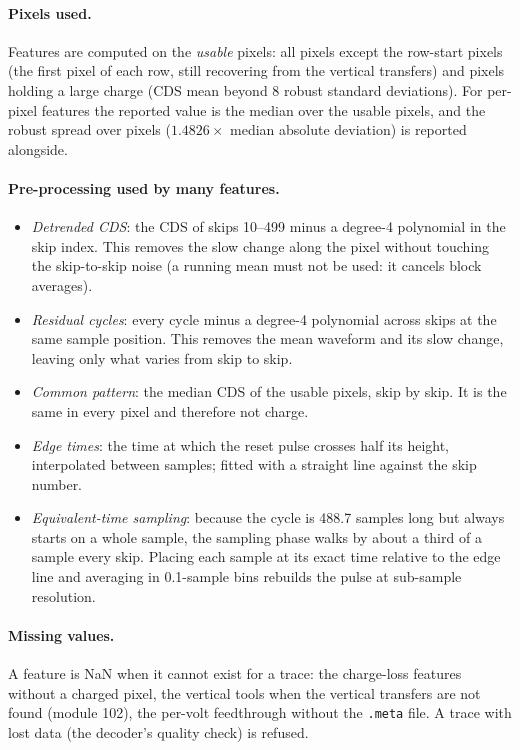 \documentclass[10pt]{article}
\newcommand{\code}[1]{\texttt{#1}}
\renewcommand{\_}{\oldunderscore\allowbreak}
\begin{document}
\paragraph{Pixels used.} Features are computed on the \emph{usable} pixels: all pixels except the row-start pixels (the first
pixel of each row, still recovering from the vertical transfers) and pixels holding a large charge (CDS mean beyond 8 robust
standard deviations). For per-pixel features the reported value is the median over the usable pixels, and the robust spread
over pixels ($1.4826\times$ median absolute deviation) is reported alongside.

\paragraph{Pre-processing used by many features.}
\begin{itemize}
  \item \emph{Detrended CDS}: the CDS of skips 10--499 minus a degree-4 polynomial in the skip index. This removes the slow change
        along the pixel without touching the skip-to-skip noise (a running mean must not be used: it cancels block averages).
  \item \emph{Residual cycles}: every cycle minus a degree-4 polynomial across skips at the same sample position. This removes the
        mean waveform and its slow change, leaving only what varies from skip to skip.
  \item \emph{Common pattern}: the median CDS of the usable pixels, skip by skip. It is the same in every pixel and therefore not charge.
  \item \emph{Edge times}: the time at which the reset pulse crosses half its height, interpolated between samples; fitted with a
        straight line against the skip number.
  \item \emph{Equivalent-time sampling}: because the cycle is 488.7 samples long but always starts on a whole sample, the sampling
        phase walks by about a third of a sample every skip. Placing each sample at its exact time relative to the edge line and
        averaging in 0.1-sample bins rebuilds the pulse at sub-sample resolution.
\end{itemize}

\paragraph{Missing values.} A feature is NaN when it cannot exist for a trace: the charge-loss features without a charged pixel,
the vertical tools when the vertical transfers are not found (module 102), the per-volt feedthrough without the \code{.meta}
file. A trace with lost data (the decoder's quality check) is refused.
\end{document}
